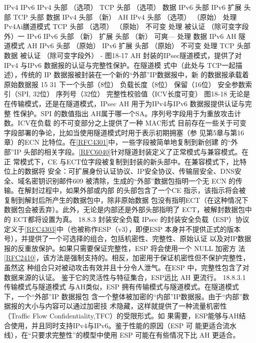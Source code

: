 IPv4
IPv6
IPv4
头部
（选项）
TCP
头部
（选项）
数据
IPv6
头部
IPv6
扩展
头部
TCP
头部
数据
IPv4
头部
（新）
AH
IPv4
头部
（选项）
（原始）
处理
Pv4Ai膳道模式
TCP
头部
（选项）
（原始）
不可变
处理
被认证
（除可变字段外）一
IPv6
IPv6
头部
（新）
扩展
头部
（新）
可爽—
处理
数据
IPv6 AH 隧道模式
AH
IPv6
头部
（原始）
IPv6
扩展
头部
（原始）
不可变
处理
TCP
头部
数据
被认证
（除可变字段外）
-
图18-17 AH 封装的IPsec隧道模式，提供了对IPv4 与IPv6 数据报的认证与完整性保护。在隧道模
式中（此处与 TCP一起描述），传统的 IP 数据报被封装在一个新的“外部”IP数据报中，新
的数据报承载着原始数据报
15
31
下一个头部（8位）
负载长度（8位）
保留（16位）
安全参数索引（SPI, 32位）
序列号（32位）
完整性校验值（ICV长度可变）
图18-18 无论是在传输模式，还是在隧道模式，IPsec AH 用于为IPv4与IPv6 数据报提供认证与完整
性保护。SPI 的数值指出 AH属于哪一个SA。序列号字段用于为重放攻击计数。ICV在负载
的不可变部分之上提供了一种 MAC形式
目前存在一些关于可变字段部署的争论，比如当使用隧道模式时用于表示初期拥塞（参
见第5章与第16章）的ECN 比特位。在\href{https://www.rfc-editor.org/rfc/rfc4301}{[RFC4301]}中，一些字段被简单地复制到新创建
的“外部”IP 头部的相关字段。\href{https://www.rfc-editor.org/rfc/rfc6040}{[RFC6040]}针对隧道封装定义了正常模式与兼容模式。在正
常模式下，CE 与ECT位字段被复制到封装的新头部中。在兼容模式下，比特位上的数据将
安全：可扩展身份认证协议、IP安全协议、传输层安全、DNS安全、域名密钥识别邮件609
被清除，生成的“外部”数据包指明一个无 ECN 的传输。在解封过程中，如果外部或内部
的头部包含了一个CE 指示，该指示将会被复制到解封后所产生的数据包中，除非原始数据
包没有指明ECT（在这种情况下数据包会被丢弃）。此外，无论是内部还是外部头部指明了
ECT，被解封数据包中的 ECT都将设置为真。
18.8.3 封装安全负载
IPsec 的封装安全负载（ESP）协议定义于\href{https://www.rfc-editor.org/rfc/rfc4303}{[RFC4303]}中（也被称作ESP（v3），即便ESP
本身并不提供正式的版本号），并提供了一个可选择的组合，包括机密性、完整性、原始认证
以及对IP数据报的反重放保护。如果只需要保证完整性，ESP 将会使用一个 NULL 加密方
法\href{https://www.rfc-editor.org/rfc/rfc2410}{[RFC2410]}，该方法是强制支持的。相反，加密用于保证机密性但不保护完整性，虽然这
种组合只对被动攻击有效并且十分令人泄气。在ESP 中，完整性包含了对数据来源的认证。
鉴于它的灵活性与特征集合，ESP远比 AH 更流行。
18.8.3.1 传输模式与隧道模式
与AH类似，ESP 拥有传输模式与隧道模式。在隧道模式下，一个“外部”IP 数据报包
含一个整体被加密的“内部”IP数据报。由于“内部”数据报的大小与内容可以通过加密技
术隐藏，这样就提供了一种流量机密性（Traffic Flow Confidentiality,TFC）的受限形式。如
果需要，ESP能够与AH结合使用，并且同时支持IPv4与IPv6。鉴于性能的原因（ESP 可
能更适合流水线），在“只要求完整性”的模型中使用 ESP 可能在有些情况下比 AH 更适合。
